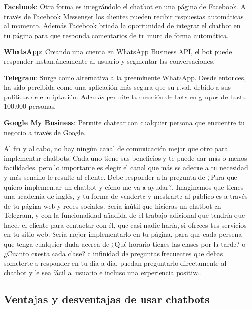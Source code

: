 {{\textbf{Facebook}: Otra forma es integrándolo el chatbot en una página de Facebook. A través de Facebook Messenger los clientes pueden recibir respuestas automáticas al momento. Además Facebook brinda la oportunidad de integrar el chatbot en tu página para que responda comentarios de tu muro de forma automática.\vspace{0.3cm}

\textbf{WhatsApp}: Creando una cuenta en WhatsApp Business API, el bot puede responder instantáneamente al usuario y segmentar las conversaciones. \vspace{0.3cm}

\textbf{Telegram}: Surge como alternativa a la preeminente WhatsApp. Desde entonces, ha sido percibida como una aplicación más segura que su rival, debido a sus políticas de encriptación. Además permite la creación de bots en grupos de hasta 100.000 personas.\vspace{0.3cm}

\textbf{Google My Business}: Permite chatear con cualquier persona que encuentre tu negocio a través de Google.

Al fin y al cabo, no hay ningún canal de comunicación mejor que otro para implementar chatbots. Cada uno tiene sus beneficios y te puede dar más o menos facilidades, pero lo importante es elegir el canal que más se adecue a tu necesidad y más sencillo le resulte al cliente. Debe responder a la pregunta de ¿Para que quiero implementar un chatbot y cómo me va a ayudar?. Imaginemos que tienes una academia de inglés, y tu forma de venderte y mostrarte al público es a través de tu página web y redes sociales. Sería inútil que hicieras un chatbot en Telegram, y con la funcionalidad añadida de el trabajo adicional que tendría que hacer el cliente para contactar con él, que casi nadie haría, si ofreces tus servicios en tu sitio web. Sería mejor implementarlo en tu página, para que cada persona que tenga cualquier duda acerca de ¿Qué horario tienes las clases por la tarde? o ¿Cuanto cuesta cada clase? o infinidad de preguntas frecuentes que debas someterte a responder en tu día a día, puedan preguntarlo directamente al chatbot y le sea fácil al usuario e incluso una experiencia positiva. 


\subsection{Ventajas y desventajas de usar chatbots}
{\vspace{0.5cm}

}}}
